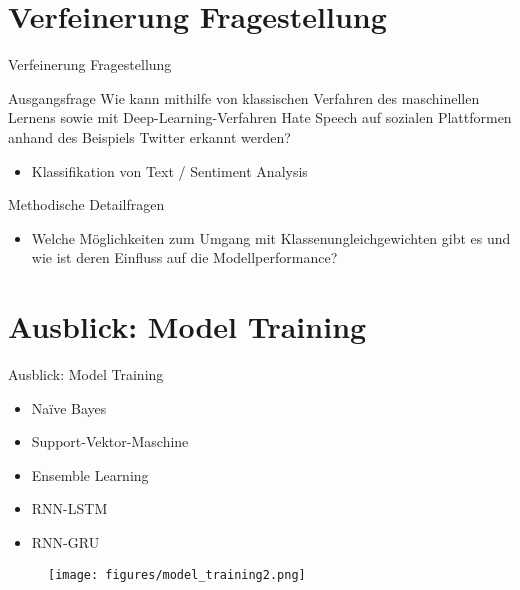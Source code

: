 \documentclass[aspectratio=169]{beamer} %
\begin{document}
\section{Verfeinerung Fragestellung}
\begin{frame}{Verfeinerung Fragestellung}
    \begin{block}{Ausgangsfrage}
        Wie kann mithilfe von klassischen Verfahren des maschinellen Lernens sowie mit Deep-Learning-Verfahren Hate Speech auf sozialen Plattformen anhand des Beispiels Twitter erkannt werden?
        \begin{itemize}
            \item Klassifikation von Text / Sentiment Analysis
        \end{itemize}
    \end{block}    
    \begin{exampleblock}{Methodische Detailfragen}
        \begin{itemize}
            \item Welche M\"oglichkeiten zum Umgang mit Klassenungleichgewichten gibt es und wie ist deren Einfluss auf die Modellperformance?
        \end{itemize}
    \end{exampleblock}
\end{frame}

\section{Ausblick: Model Training}
\begin{frame}{Ausblick: Model Training}
    \begin{itemize}[label=\textbullet]
            \item Naïve Bayes
            \item Support-Vektor-Maschine 
            \item Ensemble Learning
            \item RNN-LSTM
            \item RNN-GRU
    \end{itemize}
    
    \begin{figure}[h!]
        \centering
        \vspace{0.4cm}
        \texttt{[image: figures/model\_training2.png]}
        \label{fig:yourimage}
    \end{figure}
\end{frame}






\begin{frame}
  \titlepage
\end{frame}
\nologo
\end{document}
